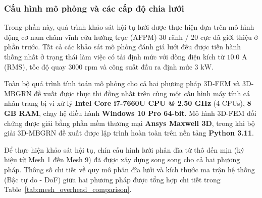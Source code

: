 \subsubsection{Cấu hình mô phỏng và các cấp độ chia lưới}

Trong phần này, quá trình khảo sát hội tụ lưới được thực hiện dựa trên mô hình động cơ nam châm vĩnh cửu hướng trục (AFPM) 30 rãnh / 20 cực đã giới thiệu ở phần trước. Tất cả các khảo sát mô phỏng đánh giá lưới đều được tiến hành thống nhất ở trạng thái làm việc có tải định mức với dòng điện kích từ $10.0\text{ A}$ (RMS), tốc độ quay $3000\text{ rpm}$ và công suất đầu ra định mức $3\text{ kW}$.

Toàn bộ quá trình tính toán mô phỏng cho cả hai phương pháp 3D-FEM và 3D-MBGRN đề xuất được thực thi đồng nhất trên cùng một cấu hình máy tính cá nhân trang bị vi xử lý \textbf{Intel Core i7-7660U CPU @ 2.50 GHz} (4 CPUs), \textbf{8 GB RAM}, chạy hệ điều hành \textbf{Windows 10 Pro 64-bit}. Mô hình 3D-FEM đối chứng được giải bằng phần mềm thương mại \textbf{Ansys Maxwell 3D}, trong khi bộ giải 3D-MBGRN đề xuất được lập trình hoàn toàn trên nền tảng \textbf{Python 3.11}.

Để thực hiện khảo sát hội tụ, chín cấu hình lưới phân đĩa từ thô đến mịn (ký hiệu từ Mesh 1 đến Mesh 9) đã được xây dựng song song cho cả hai phương pháp. Thông số chi tiết về quy mô phân đĩa lưới và kích thước ma trận hệ thống (Bậc tự do - DoF) giữa hai phương pháp được tổng hợp chi tiết trong Table~\ref{tab:mesh_overhead_comparison}.

\begin{table}[htbp]
\caption{Thông số phân đĩa lưới và kích thước ma trận của 3D-FEM và 3D-MBGRN trên 9 cấu hình lưới}
\label{tab:mesh_overhead_comparison}
\centering
{}
\end{table}


